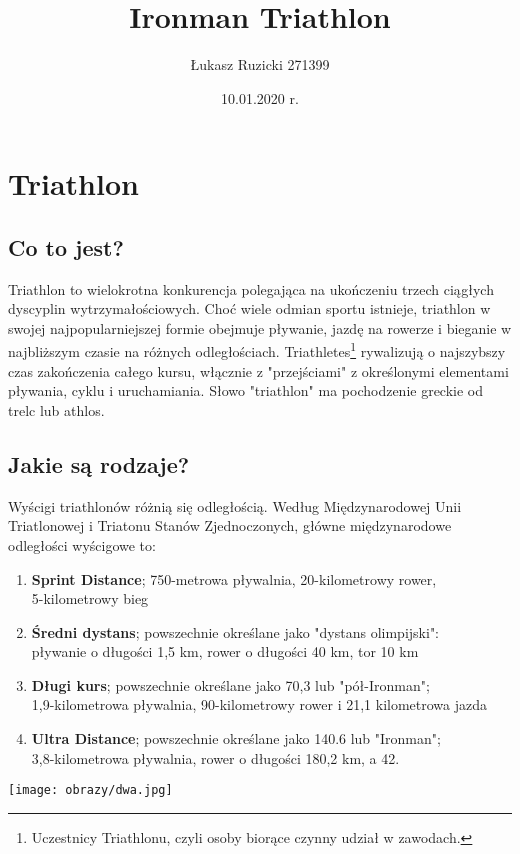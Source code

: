 \documentclass[12pt]{article}
\title{Ironman Triathlon}
\author{Łukasz Ruzicki 271399}
\date{10.01.2020 r.}
\begin{document}
\maketitle
\newpage

\tableofcontents

\newpage


\section{Triathlon}
\subsection{Co to jest?}
Triathlon to wielokrotna konkurencja polegająca na ukończeniu trzech ciągłych dyscyplin wytrzymałościowych. Choć wiele odmian sportu istnieje, triathlon w swojej najpopularniejszej formie obejmuje pływanie, jazdę na rowerze i bieganie w najbliższym czasie na różnych odległościach. Triathletes\footnote{Uczestnicy Triathlonu, czyli osoby biorące czynny udział w zawodach.} rywalizują o najszybszy czas zakończenia całego kursu, włącznie z "przejściami" z określonymi elementami pływania, cyklu i uruchamiania. Słowo "triathlon" ma pochodzenie greckie od trelc lub athlos.
\subsection{Jakie są rodzaje?}

Wyścigi triathlonów różnią się odległością. Według Międzynarodowej Unii Triatlonowej i Triatonu Stanów Zjednoczonych, główne międzynarodowe odległości wyścigowe to:
\begin{enumerate}

\item \textbf{Sprint Distance}; 750-metrowa pływalnia, 20-kilometrowy rower,\\ 5-kilometrowy bieg
\item \textbf{Średni dystans}; powszechnie określane jako "dystans olimpijski":\\ pływanie o długości 1,5 km, rower o długości 40 km, tor 10 km
\item \textbf{Długi kurs}; powszechnie określane jako 70,3 lub "pół-Ironman";\\ 1,9-kilometrowa pływalnia, 90-kilometrowy rower i 21,1 kilometrowa jazda
\item \textbf{Ultra Distance}; powszechnie określane jako 140.6 lub "Ironman";\\ 3,8-kilometrowa pływalnia, rower o długości 180,2 km, a 42.
\end{enumerate}
\begin{center}
\texttt{[image: obrazy/dwa.jpg]}
\end{center}
\end{document}
